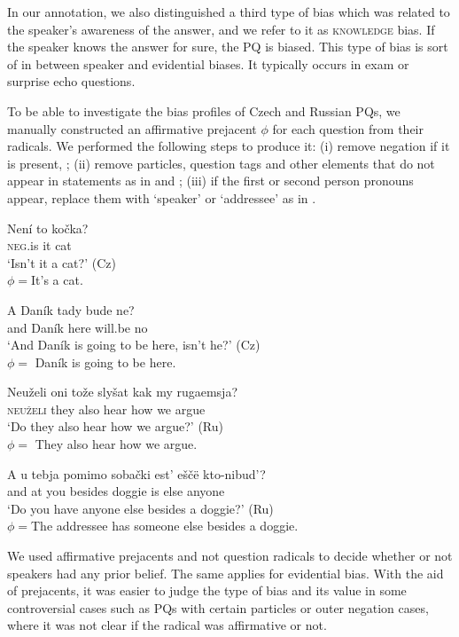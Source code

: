 \documentclass[output=paper,colorlinks,citecolor=brown]{langscibook}
\begin{document}
In our annotation, we also distinguished a third type of bias which was related to the speaker's awareness of the answer, and we refer to it as \textsc{knowledge} bias. If the speaker knows the answer for sure, the PQ is biased. This type of bias is sort of in between speaker and evidential biases. It typically occurs in exam \citep{Krifka2011} or surprise echo questions. 

To be able to investigate the bias profiles of Czech and Russian PQs, we manually constructed an affirmative prejacent $\phi$ for each question from their radicals. We performed the following steps to produce it: (i) remove negation if it is present, ; (ii) remove particles, question tags and other elements that do not appear in statements as in  and ; (iii) if the first or second person pronouns appear, replace them with `speaker' or `addressee' as in .

\ea \ea \gll Není to kočka? \\
\textsc{neg}.is it cat \\
\glt `Isn't it a cat?' \hfill (Cz) \\
 $\phi={}$It's a cat. 
\label{ex-prej1}

\ex \gll A Daník tady bude ne? \\
and Daník here will.be no \\
\glt`And Daník is going to be here, isn't he?' \hfill (Cz)\\
 $\phi={}$ Daník is going to be here.
 \label{ex-prej2}

 \ex \gll Neuželi oni tože slyšat kak my rugaemsja? \\
 \textsc{neuželi} they also hear how we argue \\
 \glt`Do they also hear how we argue?' \hfill (Ru)\\
 $\phi={}$ They also hear how we argue. 
  \label{ex-prej3}
  
\ex \gll A u tebja pomimo sobački est' eščë kto-nibud'? \\ 
and at you besides doggie is else anyone \\
\glt `Do you have anyone else besides a doggie?'  \hfill (Ru)\\
$\phi={}$The addressee has someone else besides a doggie. 
 \label{ex-prej4}
\z\z

\noindent We used affirmative prejacents and not question radicals to decide whether or not speakers had any prior belief. The same applies for evidential bias. With the aid of prejacents, it was easier to judge the type of bias and its value in some controversial cases such as PQs with certain particles or outer negation cases, where it was not clear if the radical was affirmative or not.
\end{document}
